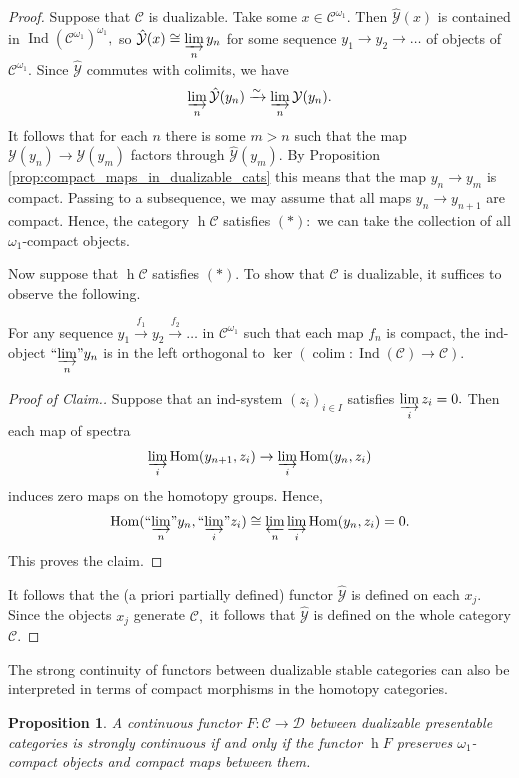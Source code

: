 \documentclass[11pt,leqno]{amsart}
\newtheorem{prop}[theo]{Proposition}
\numberwithin{equation}{section}
\def\h{\operatorname{h}}
\def\Hom{\operatorname{Hom}}
\DeclareMathOperator*{\colim}{colim}
\newcommand{\indlim}[1][]{\mathop{\varinjlim}\limits_{#1}}
\newcommand{\inddlim}[1][]{{``{\indlim[#1]}"}}
\newcommand{\prolim}[1][]{\mathop{\varprojlim}\limits_{#1}}
\newcommand{\xto}{\xrightarrow}
\newcommand{\cD}{{\mathcal D}}
\newcommand{\cC}{{\mathcal C}}
\newcommand{\cY}{{\mathcal Y}}
\newcommand{\Ind}{\operatorname{Ind}}
\begin{document}
\begin{proof}Suppose that $\cC$ is dualizable. Take some $x\in\cC^{\omega_1}.$ Then $\hat{\cY}(x)$ is contained in $\Ind(\cC^{\omega_1})^{\omega_1},$ so $\hat{\cY}(x)\cong\indlim[n]y_n$ for some sequence $y_1\to y_2\to\dots$ of objects of $\cC^{\omega_1}.$ Since $\hat{\cY}$ commutes with colimits, we have $$\indlim[n]\hat{\cY}(y_n)\xto{\sim}\indlim[n]\cY(y_n).$$ It follows that for each $n$ there is some $m>n$ such that the map $\cY(y_n)\to\cY(y_m)$ factors through $\hat{\cY}(y_m).$ By Proposition \ref{prop:compact_maps_in_dualizable_cats} this means that the map $y_n\to y_m$ is compact. Passing to a subsequence, we may assume that all maps $y_n\to y_{n+1}$ are compact. Hence, the category $\h\cC$ satisfies $(*):$ we can take the collection of all $\omega_1$-compact objects.

Now suppose that $\h\cC$ satisfies $(*).$ To show that $\cC$ is dualizable, it suffices to observe the following.

{ For any sequence $y_1\xto{f_1} y_2\xto{f_2} \dots$ in $\cC^{\omega_1}$ such that each map $f_n$ is compact, the ind-object $\inddlim[n]y_n$ is in the left orthogonal to $\ker(\colim:\Ind(\cC)\to\cC).$}

\begin{proof}[Proof of Claim.] Suppose that an ind-system $(z_i)_{i\in I}$ satisfies $\indlim[i]z_i=0.$ Then each map of spectra
$$\indlim[i]\Hom(y_{n+1},z_i)\to \indlim[i]\Hom(y_n,z_i)$$
induces zero maps on the homotopy groups. Hence,
$$\Hom(\inddlim[n]y_n,\inddlim[i]z_i)\cong\prolim[n]\indlim[i]\Hom(y_n,z_i)=0.$$
This proves the claim.
\end{proof} 

It follows that the (a priori partially defined) functor $\hat{\cY}$ is defined on each $x_j.$ Since the objects $x_j$ generate $\cC,$ it follows that $\hat{\cY}$ is defined on the whole category $\cC.$ 
\end{proof}

The strong continuity of functors between dualizable stable categories can also be interpreted in terms of compact morphisms in the homotopy categories.

\begin{prop}\label{prop:strong_continuity_of_functor_via_compact_maps} A continuous functor $F:\cC\to\cD$ between dualizable presentable categories is strongly continuous if and only if the functor $\h F$ preserves $\omega_1$-compact objects and compact maps between them.\end{prop}
\end{document}
